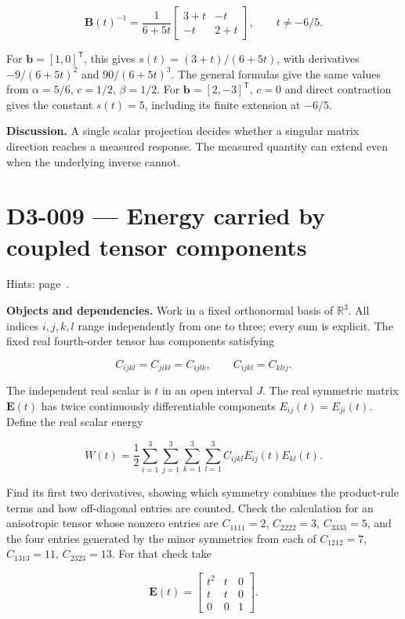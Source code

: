 \documentclass[11pt,oneside,openany]{book}
\begin{document}
\[
\mathbf B(t)^{-1}=\frac{1}{6+5t}
\begin{bmatrix}3+t&-t\\-t&2+t\end{bmatrix},\qquad t\ne-6/5.
\]

For \(\mathbf b=[1,0]^{\mathsf T}\), this gives \(s(t)=(3+t)/(6+5t)\), with derivatives \(-9/(6+5t)^2\) and \(90/(6+5t)^3\). The general formulas give the same values from \(\alpha=5/6\), \(c=1/2\), \(\beta=1/2\). For \(\mathbf b=[2,-3]^{\mathsf T}\), \(c=0\) and direct contraction gives the constant \(s(t)=5\), including its finite extension at \(-6/5\).

\textbf{Discussion.} A single scalar projection decides whether a singular matrix direction reaches a measured response. The measured quantity can extend even when the underlying inverse cannot.
\clearpage
\section{D3-009 --- Energy carried by coupled tensor components}
\label{problem:D3-009}
{\small Hints: page~\pageref{hints:D3-009}.}\par\medskip

\textbf{Objects and dependencies.} Work in a fixed orthonormal basis of \(\mathbb R^3\). All indices \(i,j,k,l\) range independently from one to three; every sum is explicit. The fixed real fourth-order tensor has components satisfying

\[
C_{ijkl}=C_{jikl}=C_{ijlk},\qquad C_{ijkl}=C_{klij}.
\]

The independent real scalar is \(t\) in an open interval \(J\). The real symmetric matrix \(\mathbf E(t)\) has twice continuously differentiable components \(E_{ij}(t)=E_{ji}(t)\). Define the real scalar energy

\[
W(t)=\frac12\sum_{i=1}^3\sum_{j=1}^3\sum_{k=1}^3\sum_{l=1}^3
C_{ijkl}E_{ij}(t)E_{kl}(t).
\]

Find its first two derivatives, showing which symmetry combines the product-rule terms and how off-diagonal entries are counted. Check the calculation for an anisotropic tensor whose nonzero entries are \(C_{1111}=2\), \(C_{2222}=3\), \(C_{3333}=5\), and the four entries generated by the minor symmetries from each of \(C_{1212}=7\), \(C_{1313}=11\), \(C_{2323}=13\). For that check take

\[
\mathbf E(t)=\begin{bmatrix}t^2&t&0\\t&t&0\\0&0&1\end{bmatrix}.
\]
\end{document}

